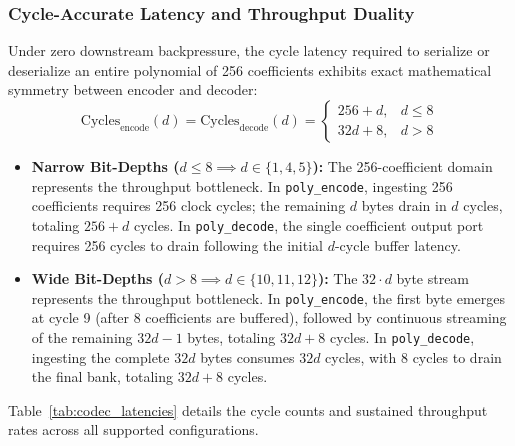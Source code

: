 \subsubsection{Cycle-Accurate Latency and Throughput Duality}
Under zero downstream backpressure, the cycle latency required to serialize or deserialize an entire polynomial of 256 coefficients exhibits exact mathematical symmetry between encoder and decoder:
\begin{equation}
\label{eq:codec_cycles_sym}
\text{Cycles}_{\text{encode}}(d) = \text{Cycles}_{\text{decode}}(d) = \begin{cases} 
256 + d, & d \le 8 \\ 
32d + 8, & d > 8 
\end{cases}
\end{equation}
\begin{itemize}
    \item \textbf{Narrow Bit-Depths ($d \le 8 \implies d \in \{1, 4, 5\}$):} The 256-coefficient domain represents the throughput bottleneck. In \texttt{poly\_encode}, ingesting 256 coefficients requires 256 clock cycles; the remaining $d$ bytes drain in $d$ cycles, totaling $256 + d$ cycles. In \texttt{poly\_decode}, the single coefficient output port requires 256 cycles to drain following the initial $d$-cycle buffer latency.
    \item \textbf{Wide Bit-Depths ($d > 8 \implies d \in \{10, 11, 12\}$):} The $32 \cdot d$ byte stream represents the throughput bottleneck. In \texttt{poly\_encode}, the first byte emerges at cycle 9 (after 8 coefficients are buffered), followed by continuous streaming of the remaining $32d - 1$ bytes, totaling $32d + 8$ cycles. In \texttt{poly\_decode}, ingesting the complete $32d$ bytes consumes $32d$ cycles, with 8 cycles to drain the final bank, totaling $32d + 8$ cycles.
\end{itemize}

Table~\ref{tab:codec_latencies} details the cycle counts and sustained throughput rates across all supported configurations.

